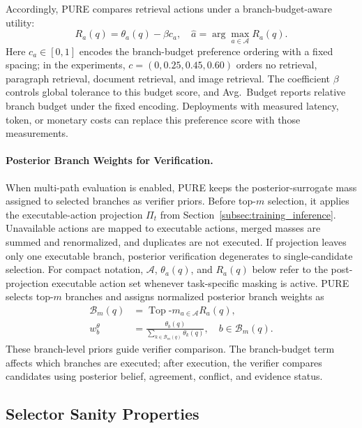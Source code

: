 \documentclass[a4paper,fleqn]{cas-dc}
\begin{document}
Accordingly, PURE compares retrieval actions under a branch-budget-aware utility:
\begin{equation}
\label{eq:branch_budget_utility}
R_a(q)
=
\theta_a(q)-\beta c_a,
\quad
\hat{a}
=
\arg\max_{a\in\mathcal{A}}R_a(q).
\end{equation}
Here $c_a\in[0,1]$ encodes the branch-budget preference ordering with a fixed spacing; in the experiments, $c=(0,0.25,0.45,0.60)$ orders no retrieval, paragraph retrieval, document retrieval, and image retrieval. The coefficient $\beta$ controls global tolerance to this budget score, and Avg.~Budget reports relative branch budget under the fixed encoding. Deployments with measured latency, token, or monetary costs can replace this preference score with those measurements.

\paragraph{Posterior Branch Weights for Verification.}
When multi-path evaluation is enabled, PURE keeps the posterior-surrogate mass assigned to selected branches as verifier priors. Before top-$m$ selection, it applies the executable-action projection $\Pi_t$ from Section~\ref{subsec:training_inference}. Unavailable actions are mapped to executable actions, merged masses are summed and renormalized, and duplicates are not executed. If projection leaves only one executable branch, posterior verification degenerates to single-candidate selection. For compact notation, $\mathcal{A}$, $\theta_a(q)$, and $R_a(q)$ below refer to the post-projection executable action set whenever task-specific masking is active. PURE selects top-$m$ branches and assigns normalized posterior branch weights as
\begin{equation}
\label{eq:top_m_branches}
\begin{aligned}
\mathcal{B}_m(q)
&=
\operatorname{Top}\text{-}m_{a\in\mathcal{A}} R_a(q),\\
w_b^{\theta}
&=
\frac{\theta_b(q)}
{\sum_{k\in\mathcal{B}_m(q)}\theta_k(q)},
\quad b\in\mathcal{B}_m(q).
\end{aligned}
\end{equation}
These branch-level priors guide verifier comparison. The branch-budget term affects which branches are executed; after execution, the verifier compares candidates using posterior belief, agreement, conflict, and evidence status.



\subsection{Selector Sanity Properties}
\label{subsec:theoretical_properties}
\end{document}

